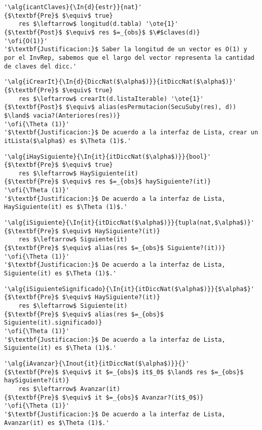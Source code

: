 \begin{lstlisting}[mathescape]
'\alg{icantClaves}{\In{d}{estr}}{nat}'
{$\textbf{Pre}$ $\equiv$ true}
	res $\leftarrow$ longitud(d.tabla) '\ote{1}'
{$\textbf{Post}$ $\equiv$ res $=_{obs}$ $\#$claves(d)}
'\ofi{O(1)}'
'$\textbf{Justificacion:}$ Saber la longitud de un vector es O(1) y por el InvRep, sabemos que el largo del vector representa la cantidad de claves del dicc.'
\end{lstlisting}

\begin{lstlisting}[mathescape]
'\alg{iCrearIt}{\In{d}{DiccNat($\alpha$)}}{itDiccNat($\alpha$)}'
{$\textbf{Pre}$ $\equiv$ true}
	res $\leftarrow$ crearIt(d.listaIterable) '\ote{1}'
{$\textbf{Post}$ $\equiv$ alias(esPermutacion(SecuSuby(res), d)) $\land$ vacia?(Anteriores(res))}
'\ofi{\Theta (1)}'
'$\textbf{Justificacion:}$ De acuerdo a la interfaz de Lista, crear un itLista($\alpha$) es $\Theta (1)$.'
\end{lstlisting}

\begin{lstlisting}[mathescape]
'\alg{iHaySiguiente}{\In{it}{itDiccNat($\alpha$)}}{bool}'
{$\textbf{Pre}$ $\equiv$ true}
	res $\leftarrow$ HaySiguiente(it)
{$\textbf{Pre}$ $\equiv$ res $=_{obs}$ haySiguiente?(it)}
'\ofi{\Theta (1)}'
'$\textbf{Justificacion:}$ De acuerdo a la interfaz de Lista, HaySiguiente(it) es $\Theta (1)$.'
\end{lstlisting}

\begin{lstlisting}[mathescape]
'\alg{iSiguiente}{\In{it}{itDiccNat($\alpha$)}}{tupla(nat,$\alpha$)}'
{$\textbf{Pre}$ $\equiv$ HaySiguiente?(it)}
	res $\leftarrow$ Siguiente(it)
{$\textbf{Pre}$ $\equiv$ alias(res $=_{obs}$ Siguiente?(it))}
'\ofi{\Theta (1)}'
'$\textbf{Justificacion:}$ De acuerdo a la interfaz de Lista, Siguiente(it) es $\Theta (1)$.'
\end{lstlisting}

\begin{lstlisting}[mathescape]
'\alg{iSiguienteSignificado}{\In{it}{itDiccNat($\alpha$)}}{$\alpha$}'
{$\textbf{Pre}$ $\equiv$ HaySiguiente?(it)}
	res $\leftarrow$ Siguiente(it)
{$\textbf{Pre}$ $\equiv$ alias(res $=_{obs}$ Siguiente(it).significado)}
'\ofi{\Theta (1)}'
'$\textbf{Justificacion:}$ De acuerdo a la interfaz de Lista, Siguiente(it) es $\Theta (1)$.'
\end{lstlisting}

\begin{lstlisting}[mathescape]
'\alg{iAvanzar}{\Inout{it}{itDiccNat($\alpha$)}}{}'
{$\textbf{Pre}$ $\equiv$ it $=_{obs}$ it$_0$ $\land$ res $=_{obs}$ haySiguiente?(it)}
	res $\leftarrow$ Avanzar(it)
{$\textbf{Pre}$ $\equiv$ it $=_{obs}$ Avanzar?(it$_0$)}
'\ofi{\Theta (1)}'
'$\textbf{Justificacion:}$ De acuerdo a la interfaz de Lista, Avanzar(it) es $\Theta (1)$.'
\end{lstlisting}
